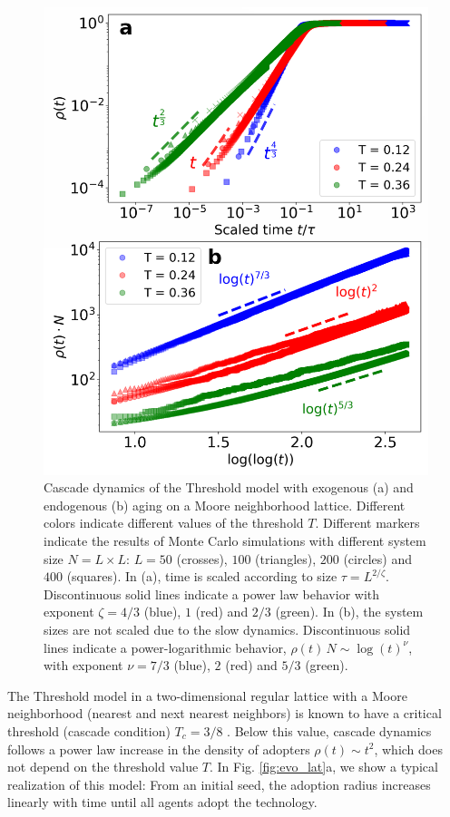 \begin{figure}
\includegraphics[width=\columnwidth]{Figs/Aging_Threshold/FIG_EVO.png}
\caption{\label{fig:lattice} Cascade dynamics of the Threshold model with exogenous (a) and endogenous (b) aging on a Moore neighborhood lattice. Different colors indicate different values of the threshold $T$. Different markers indicate the results of Monte Carlo simulations with different system size $N = L \times L$:  $L = 50$ (crosses), $100$ (triangles), $200$ (circles) and $400$ (squares). In (a), time is scaled according to size $\tau = L^{2 / \zeta}$. Discontinuous solid lines indicate a power law behavior with exponent $ \zeta = 4/3$ (blue), $1$ (red) and $2/3$ (green). In (b), the system sizes are not scaled due to the slow dynamics. Discontinuous solid lines indicate a power-logarithmic behavior, $\rho(t) \, N \sim \log(t)^{\nu} $, with exponent $ \nu = 7/3$ (blue), $2$ (red) and $5/3$ (green).}
\end{figure}

The Threshold model in a two-dimensional regular lattice with a Moore neighborhood (nearest and next nearest neighbors) is known to have a critical threshold (cascade condition) $T_c = 3/8$ \cite{centola-2007}. Below this value, cascade dynamics follows a power law increase in the density of adopters $\rho(t) \sim t^2$, which does not depend on the threshold value $T$. In Fig. \ref{fig:evo_lat}a, we show a typical realization of this model: From an initial seed, the adoption radius increases linearly with time until all agents adopt the technology.

